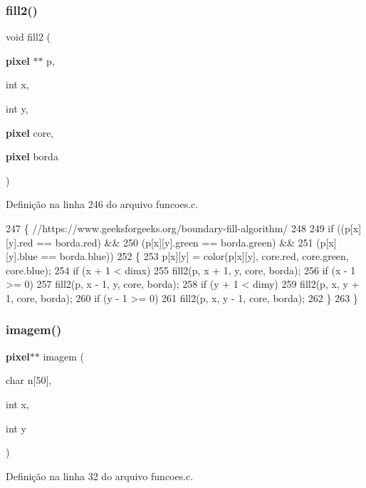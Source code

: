 \subsubsection{fill2()}
{\footnotesize\ttfamily void fill2 (\begin{DoxyParamCaption}\item[{\textbf{ pixel} $\ast$$\ast$}]{p,  }\item[{int}]{x,  }\item[{int}]{y,  }\item[{\textbf{ pixel}}]{core,  }\item[{\textbf{ pixel}}]{borda }\end{DoxyParamCaption})}



Definição na linha 246 do arquivo funcoes.\+c.


\begin{DoxyCode}
247 \{ \textcolor{comment}{//https://www.geeksforgeeks.org/boundary-fill-algorithm/}
248 
249     \textcolor{keywordflow}{if} ((p[x][y].red == borda.red) &&
250         (p[x][y].green == borda.green) &&
251         (p[x][y].blue == borda.blue))
252     \{
253         p[x][y] = color(p[x][y], core.red, core.green, core.blue);
254         \textcolor{keywordflow}{if} (x + 1 < dimx)
255             fill2(p, x + 1, y, core, borda);
256         \textcolor{keywordflow}{if} (x - 1 >= 0)
257             fill2(p, x - 1, y, core, borda);
258         \textcolor{keywordflow}{if} (y + 1 < dimy)
259             fill2(p, x, y + 1, core, borda);
260         \textcolor{keywordflow}{if} (y - 1 >= 0)
261             fill2(p, x, y - 1, core, borda);
262     \}
263 \}
\end{DoxyCode}
\mbox{\label{funcoes_8c_a1132b052e1af963e3a96ad9927d3d99a}} 
\subsubsection{imagem()}
{\footnotesize\ttfamily \textbf{ pixel}$\ast$$\ast$ imagem (\begin{DoxyParamCaption}\item[{char}]{n[50],  }\item[{int}]{x,  }\item[{int}]{y }\end{DoxyParamCaption})}



Definição na linha 32 do arquivo funcoes.\+c.


